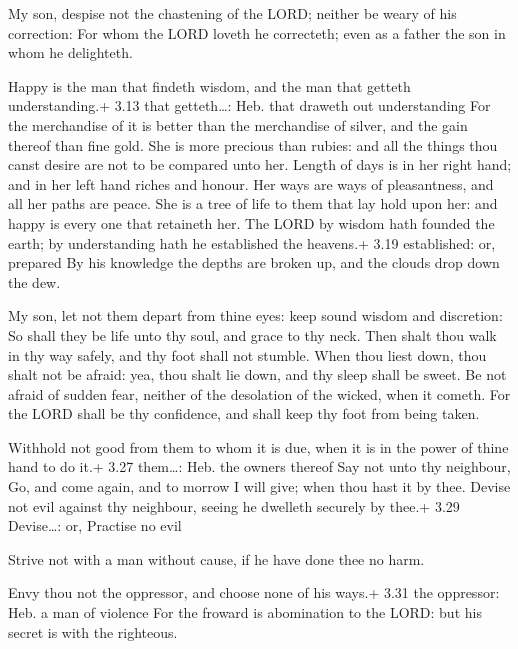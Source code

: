  My son, despise not the chastening of the LORD; neither
be weary of his correction:  For whom the LORD loveth he
correcteth; even as a father the son in whom he delighteth.

 Happy is the man that findeth wisdom, and the man that
getteth understanding.+ 3.13 that getteth\ldots: Heb. that draweth out
understanding  For the merchandise of it is better than the
merchandise of silver, and the gain thereof than fine gold.
 She is more precious than rubies: and all the things thou
canst desire are not to be compared unto her.  Length of
days is in her right hand; and in her left hand riches and honour.
 Her ways are ways of pleasantness, and all her paths are
peace.  She is a tree of life to them that lay hold upon
her: and happy is every one that retaineth her.  The LORD
by wisdom hath founded the earth; by understanding hath he established
the heavens.+ 3.19 established: or, prepared  By his
knowledge the depths are broken up, and the clouds drop down the dew.

 My son, let not them depart from thine eyes: keep sound
wisdom and discretion:  So shall they be life unto thy
soul, and grace to thy neck.  Then shalt thou walk in thy
way safely, and thy foot shall not stumble.  When thou
liest down, thou shalt not be afraid: yea, thou shalt lie down, and thy
sleep shall be sweet.  Be not afraid of sudden fear,
neither of the desolation of the wicked, when it cometh. 
For the LORD shall be thy confidence, and shall keep thy foot from being
taken.

 Withhold not good from them to whom it is due, when it
is in the power of thine hand to do it.+ 3.27 them\ldots: Heb. the
owners thereof  Say not unto thy neighbour, Go, and come
again, and to morrow I will give; when thou hast it by thee.
 Devise not evil against thy neighbour, seeing he dwelleth
securely by thee.+ 3.29 Devise\ldots: or, Practise no evil

 Strive not with a man without cause, if he have done
thee no harm.

 Envy thou not the oppressor, and choose none of his
ways.+ 3.31 the oppressor: Heb. a man of violence  For the
froward is abomination to the LORD: but his secret is with the
righteous.

